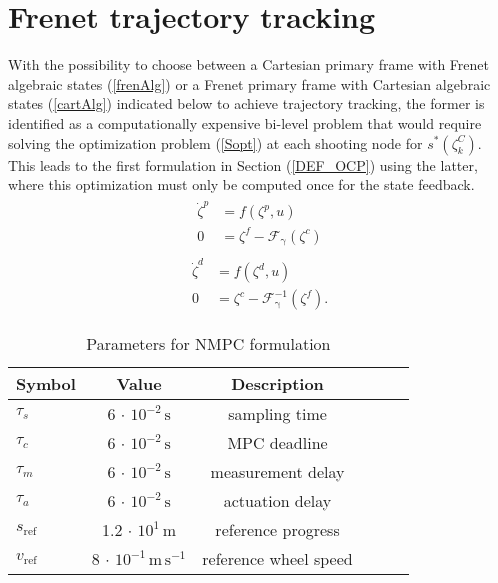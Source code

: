 \section{Frenet trajectory tracking}\label{appr_fren_traj}
With the possibility to choose between a Cartesian primary frame with Frenet algebraic states (\ref{frenAlg}) or a Frenet primary frame with Cartesian algebraic states (\ref{cartAlg}) indicated below to achieve trajectory tracking, the former is identified as a computationally expensive bi-level problem that would require solving the optimization problem (\ref{Sopt}) at each shooting node for $s^{*}(\zeta^{C}_{k})$. This leads to the first formulation in Section (\ref{DEF_OCP}) using the latter, where this optimization must only be computed once for the state feedback.
\begin{align}
    \begin{split}
        \dot{\zeta}^{p} &= f(\zeta^{p}, u)\\
        0 &= {\zeta}^{f} - \mathcal{F}_{\upgamma}(\zeta^{c}) \label{frenAlg}
    \end{split}
\end{align}
\begin{align}
    \begin{split}
    \dot{\zeta}^{d} &= f(\zeta^{d}, u)\\
    0 &= {\zeta}^{c} - \mathcal{F}^{-1}_{\upgamma}(\zeta^{f}) \label{cartAlg}.
    \end{split}
\end{align}
\begin{table}[htbp]\label{table2}
    \small
	\begin{center}
        \begin{tabular}{lccccl}\toprule
		    \textbf{Symbol} & \textbf{Value} & \textbf{Description}\\
            \midrule
            $\tau_{s} $ & 6 $\cdot$ $10^{-2}\,\mathrm{s}$& sampling time \\
            $\tau_{c} $ & 6 $\cdot$ $10^{-2}\,\mathrm{s}$& MPC deadline \\
            $\tau_{m} $ & 6 $\cdot$ $10^{-2}\,\mathrm{s}$& measurement delay \\
            $\tau_{a} $ & 6 $\cdot$ $10^{-2}\,\mathrm{s}$ & actuation delay \\
            $s_{\mathrm{ref}}$ & 1.2 $\cdot$ $10^{1}\,\mathrm{m}$ & reference progress \\
            $v_{\mathrm{ref}}$ & 8 $\cdot$ $10^{-1}\,\mathrm{m\,s^{-1}}$ & reference wheel speed \\
		    \bottomrule
		\end{tabular}
	\end{center}
    \caption{Parameters for NMPC formulation}
\end{table}
